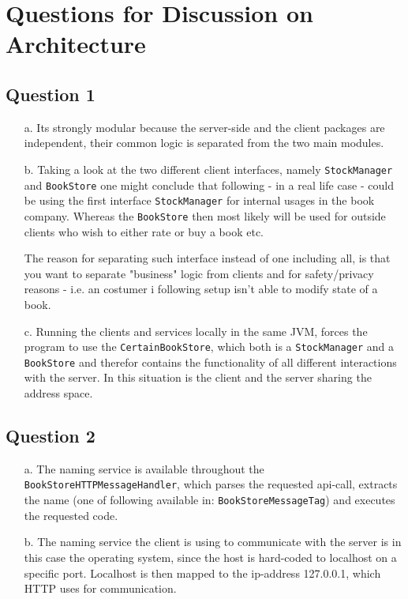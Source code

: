 \documentclass[10pt,a4paper]{article}
\begin{document}
\section*{Questions for Discussion on Architecture}
\subsection*{Question 1}
\begin{itemize}
	\item[a.] Its strongly modular because the server-side and the client packages are independent, their common logic is separated from the two main modules.
	\item[b.] Taking a look at the two different client interfaces, namely \texttt{StockManager} and \texttt{BookStore} one might conclude that following - in a real life case - could be using the first interface \texttt{StockManager} for internal usages in the book company. Whereas the \texttt{BookStore} then most likely will be used for outside clients who wish to either rate or buy a book etc.
	\newline
	
	The reason for separating such interface instead of one including all, is that you want to separate "business" logic from clients and for safety/privacy reasons - i.e. an costumer i following setup isn't able to modify state of a book.
	\item[c.] Running the clients and services locally in the same JVM, forces the program to use the \texttt{CertainBookStore}, which both is a \texttt{StockManager} and a \texttt{BookStore} and therefor contains the functionality of all different interactions with the server. In this situation is the client and the server sharing the address space.
\end{itemize}

\subsection*{Question 2}
\begin{itemize}
	\item[a.] The naming service is available throughout the \texttt{BookStoreHTTPMessageHandler}, which parses the requested api-call, extracts the name (one of following available in: \texttt{BookStoreMessageTag}) and executes the requested code.
	\item[b.] The naming service the client is using to communicate with the server is in this case the operating system, since the host is hard-coded to localhost on a specific port. Localhost is then mapped to the ip-address 127.0.0.1, which HTTP uses for communication.
\end{itemize}
\end{document}
